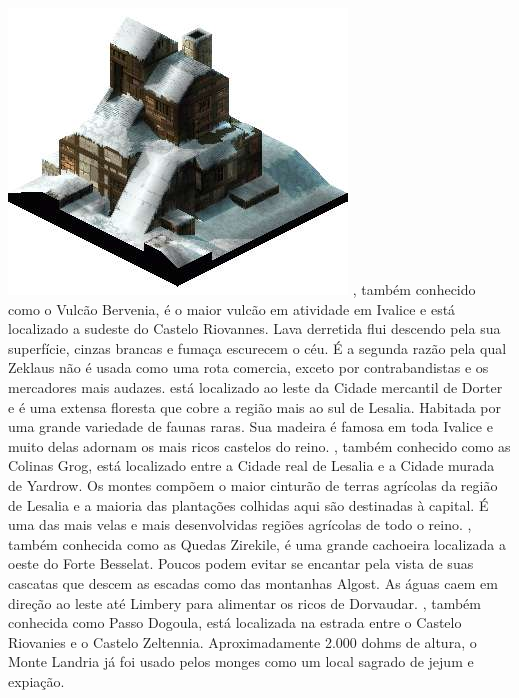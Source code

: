 \includegraphics[width=\columnwidth]{./art/worldbook/goland.jpg}
\vfill
%
, também conhecido como o Vulcão Bervenia, é o maior vulcão em atividade em Ivalice e está localizado a sudeste do Castelo Riovannes. Lava derretida flui descendo pela sua superfície, cinzas brancas e fumaça escurecem o céu.
É a segunda razão pela qual Zeklaus não é usada como uma rota comercia, exceto por contrabandistas e os mercadores mais audazes.
 está localizado ao leste da Cidade mercantil de Dorter e é uma extensa floresta que cobre a região mais ao sul de Lesalia. Habitada por uma grande variedade de faunas raras.
Sua madeira é famosa em toda Ivalice e muito delas adornam os mais ricos castelos do reino.
, também conhecido como as Colinas Grog, está localizado entre a Cidade real de Lesalia e a Cidade murada de Yardrow.
Os montes compõem o maior cinturão de terras agrícolas da região de Lesalia e a maioria das plantações colhidas aqui são destinadas à capital.
É uma das mais velas e mais desenvolvidas regiões agrícolas de todo o reino.
, também conhecida como as Quedas Zirekile, é uma grande cachoeira localizada a oeste do Forte Besselat. Poucos podem evitar se encantar pela vista de suas cascatas que descem as escadas como das montanhas Algost.
As águas caem em direção ao leste até Limbery para alimentar os ricos de Dorvaudar.
, também conhecida como Passo Dogoula, está localizada na estrada entre o Castelo Riovanies e o Castelo Zeltennia.
Aproximadamente 2.000 dohms de altura, o Monte Landria já foi usado pelos monges como um local sagrado de jejum e expiação.
